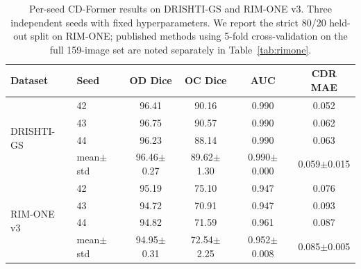 \begin{table}[t]
\centering
\caption{Per-seed CD-Former results on DRISHTI-GS and RIM-ONE v3.
Three independent seeds with fixed hyperparameters. We report the strict 
80/20 held-out split on RIM-ONE; published methods using 5-fold cross-validation
on the full 159-image set are noted separately in Table~\ref{tab:rimone}.}
\label{tab:per_seed}
\setlength{\tabcolsep}{5pt}
\begin{tabular}{llcccc}
\toprule
\textbf{Dataset} & \textbf{Seed} & \textbf{OD Dice} & \textbf{OC Dice} & \textbf{AUC} & \textbf{CDR MAE} \\
\midrule
\multirow{4}{*}{DRISHTI-GS}
& 42       & 96.41 & 90.16 & 0.990 & 0.052 \\
& 43       & 96.75 & 90.57 & 0.990 & 0.062 \\
& 44       & 96.23 & 88.14 & 0.990 & 0.063 \\
\cmidrule(lr){2-6}
& mean$\pm$std & 96.46$\pm$0.27 & 89.62$\pm$1.30 & 0.990$\pm$0.000 & 0.059$\pm$0.015 \\
\midrule
\multirow{4}{*}{RIM-ONE v3}
& 42       & 95.19 & 75.10 & 0.947 & 0.076 \\
& 43       & 94.72 & 70.91 & 0.947 & 0.093 \\
& 44       & 94.82 & 71.59 & 0.961 & 0.087 \\
\cmidrule(lr){2-6}
& mean$\pm$std & 94.95$\pm$0.31 & 72.54$\pm$2.25 & 0.952$\pm$0.008 & 0.085$\pm$0.005 \\
\bottomrule
\end{tabular}
\end{table}


